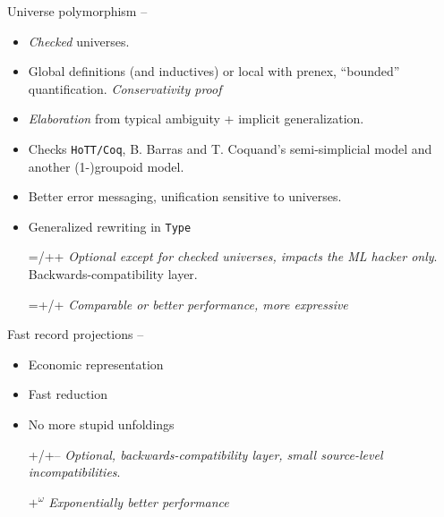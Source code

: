 \begin{subsecframe}{Universe polymorphism -- }
  \begin{itemize}
  \item \emph{Checked} universes.
  \item Global definitions (and inductives) or local with prenex, ``bounded''
    quantification. \emph{Conservativity proof}
  \item \emph{Elaboration} from typical ambiguity + implicit
    generalization.
  \item Checks \texttt{HoTT/Coq}, B. Barras and T. Coquand's semi-simplicial
    model and another (1-)groupoid model.
    \pause
  \item Better error messaging, unification sensitive to universes.
  \item Generalized rewriting in \alert{\texttt{Type}}
  \end{itemize}

  \begin{itemize}
  \item[=/++] \emph{Optional except for checked
      universes, impacts the ML hacker only}. Backwards-compatibility layer.
  \item[=+/+] \emph{Comparable or better performance, more expressive}
  \end{itemize}
  
\end{subsecframe}

\begin{subsecframe}{Fast record projections -- }
  \begin{itemize}
  \item Economic representation
  \item Fast reduction
  \item No more stupid unfoldings
  \end{itemize}
  
  \begin{itemize}
  \item[+/+--] \emph{Optional, backwards-compatibility layer,
      small source-level incompatibilities}.
  \item[${+}^{ω}$] \emph{Exponentially better performance}
  \end{itemize}


\end{subsecframe}

